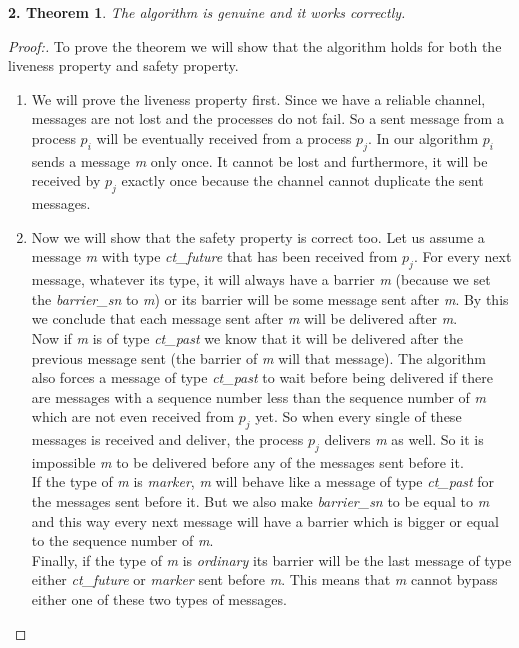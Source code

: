 \documentclass[12pt]{article}
\theoremstyle{plain}
\begin{document}
\newtheorem*{th1}{2.  Theorem}
\begin{th1}
  The algorithm is genuine and it works correctly.
\end{th1}
\begin{proof}[Proof:]
  To prove the theorem we will show that the algorithm holds for both the
  liveness property and safety property.
  \begin{enumerate}
    \item We will prove the liveness property first. Since we have a reliable
      channel, messages are not lost and the processes do not fail. So a sent 
      message from a process $p_i$ will be eventually received  from a process 
      $p_j$. In our algorithm $p_i$ sends a message \emph{m} only once. It
      cannot be lost and furthermore, it will be received by $p_j$ exactly once
      because the channel cannot duplicate the sent messages. \\
    \item Now we will show that the safety property is correct too. Let us
      assume a message \emph{m} with type \emph{ct\_future} that has been
      received from $p_j$. For every next message, whatever its type, it will
      always have a barrier \emph{m} (because we set the \emph{barrier\_sn} to
      \emph{m}) or its barrier will be some message sent after \emph{m}. By this
      we conclude that each message sent after \emph{m} will be delivered after
      \emph{m}. \\
      Now if \emph{m} is of type \emph{ct\_past} we know that it will be
      delivered after the previous message sent (the barrier of \emph{m} will
      that message). The algorithm also forces a message of type \emph{ct\_past}
      to wait before being delivered if there are messages with a sequence
      number less than the sequence number of \emph{m} which are not even
      received from $p_j$ yet. So when every single of these messages is
      received and deliver, the process $p_j$ delivers \emph{m} as well. So it
      is impossible \emph{m} to be delivered before any of the messages sent
      before it. \\
      If the type of \emph{m} is \emph{marker}, \emph{m} will behave like a
      message of type \emph{ct\_past} for the messages sent before it. But we
      also make \emph{barrier\_sn} to be equal to \emph{m} and this way every
      next message will have a barrier which is bigger or equal to the sequence
      number of \emph{m}. \\
      Finally, if the type of \emph{m} is \emph{ordinary} its barrier will be
      the last message of type either \emph{ct\_future} or \emph{marker} sent
      before \emph{m}. This means that \emph{m} cannot bypass either one of
      these two types of messages.
  \end{enumerate}
\end{proof}
\end{document}
